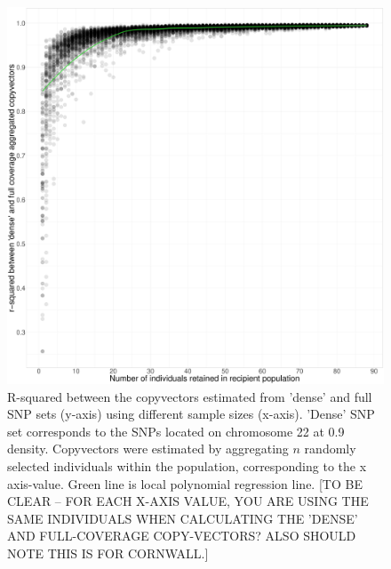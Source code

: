 \begin{figure}[htp]
    \centering
    \includegraphics[width=1.0\textwidth]{../images/chapter1/Ssparse_cornwall_collapsed_random_remove_inds.pdf}
    \caption{R-squared between the copyvectors estimated from 'dense' and full SNP sets (y-axis) using different sample sizes (x-axis). 'Dense' SNP set corresponds to the SNPs located on chromosome 22 at 0.9 density. Copyvectors were estimated by aggregating $n$ randomly selected individuals within the population, corresponding to the x axis-value. Green line is local polynomial regression line. {\color{red}[TO BE CLEAR -- FOR EACH X-AXIS VALUE, YOU ARE USING THE SAME INDIVIDUALS WHEN CALCULATING THE 'DENSE' AND FULL-COVERAGE COPY-VECTORS? ALSO SHOULD NOTE THIS IS FOR CORNWALL.]}}
    \label{fig:Ssparse_cornwall_collapsed_random_remove_inds}
\end{figure}

